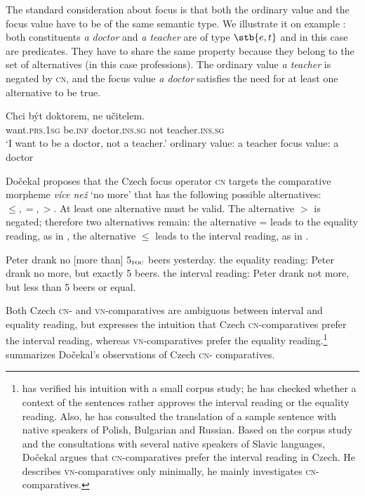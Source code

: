 \documentclass[output=paper,
]{langscibook}
\begin{document}
The standard consideration about focus is that both the ordinary value and the focus value have to be of the same semantic type. We illustrate it on example : both constituents \textit{a doctor} and \textit{a teacher} are of type $\stb{e,t}$ and in this case are predicates. They have to share the same property because they belong to the set of alternatives (in this case professions). The ordinary value \textit{a teacher} is negated by \textsc{cn}, and the focus value \textit{a doctor} satisfies the need for at least one alternative to be true. 

\ea \label{ex:doktor} \gll Chci být doktorem, ne učitelem.\\
want.\textsc{prs.1sg} be.\textsc{inf} doctor.\textsc{ins.sg} not teacher.\textsc{ins.sg}\\
	\glt `I want to be a doctor, not a teacher.'
    \ea ordinary value: a teacher
    \ex focus value: a doctor
\z
\z

\noindent Dočekal proposes that the Czech focus operator \textsc{cn} targets the comparative morpheme \textit{více než} `no more' that has the following possible alternatives: $\leq, =, >$. At least one alternative must be valid. The alternative $>$ is negated; therefore two alternatives remain: the alternative = leads to the equality reading, as in , the alternative $\leq$ leads to the interval reading, as in .

\ea Peter drank no [more than] 5$_{\textsc{foc}}$ beers yesterday. 
	\ea the equality reading: Peter drank no more, but exactly 5 beers. \label{ex:exh_beer}
	\ex the interval reading: Peter drank not more, but less than 5 beers or equal. \label{ex:int_beer}
\z
\z

\noindent Both Czech \textsc{cn-} and \textsc{vn-}comparatives are ambiguous between interval and equality reading, but \cite{dovcekal2017upper} expresses the intuition that Czech \textsc{cn-}comparatives prefer the interval reading, whereas \textsc{vn-}comparatives prefer the equality reading.\footnote{\cite{dovcekal2017upper} has verified his intuition with a small corpus study; he has checked whether a context of the sentences rather approves the interval reading or the equality reading. Also, he has consulted the translation of a sample sentence with native speakers of Polish, Bulgarian and Russian. Based on the corpus study and the consultations with several native speakers of Slavic languages, Dočekal argues that \textsc{cn-}comparatives prefer the interval reading in Czech. He describes \textsc{vn-}comparatives only minimally, he mainly investigates \textsc{cn-}comparatives.
}  summarizes Dočekal's observations of Czech \textsc{cn-} comparatives.
\end{document}

